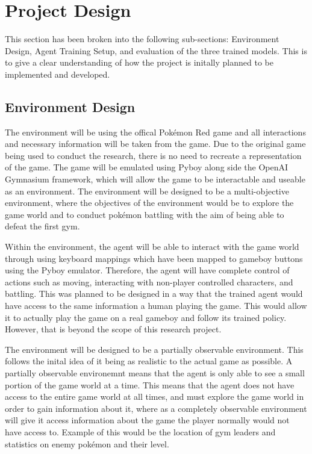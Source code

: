 \section{Project Design}

This section has been broken into the following sub-sections: Environment Design, Agent Training Setup, and evaluation of the three trained models. This is to give a clear understanding of how the project is initally planned to be implemented and developed.

\subsection{Environment Design}

The environment will be using the offical Pokémon Red game and all interactions and necessary information will be taken from the game. Due to the original game being used to conduct the research, there is no need to recreate a representation of the game. The game will be emulated using Pyboy along side the OpenAI Gymnasium framework, which will allow the game to be interactable and useable as an environment. The environment will be designed to be a multi-objective environment, where the objectives of the environment would be to explore the game world and to conduct pokémon battling with the aim of being able to defeat the first gym. 

Within the environment, the agent will be able to interact with the game world through using keyboard mappings which have been mapped to gameboy buttons using the Pyboy emulator. Therefore, the agent will have complete control of actions such as moving, interacting with non-player controlled characters, and battling. This was planned to be designed in a way that the trained agent would have access to the same information a human playing the game. This would allow it to actually play the game on a real gameboy and follow its trained policy. However, that is beyond the scope of this research project.

The environment will be designed to be a partially observable environment. This follows the inital idea of it being as realistic to the actual game as possible. A partially observable environemnt means that the agent is only able to see a small portion of the game world at a time. This means that the agent does not have access to the entire game world at all times, and must explore the game world in order to gain information about it, where as a completely observable environment will give it access information about the game the player normally would not have access to. Example of this would be the location of gym leaders and statistics on enemy pokémon and their level. 

